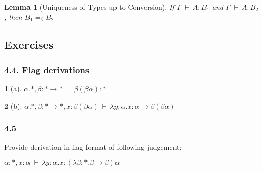 \documentclass[12pt, a4paper]{article}
\newcommand{\deriv}{\ \vdash\ }
\newtheorem{lemma}{Lemma}[section]
\newtheorem*{exercise}{}
\begin{document}
\begin{lemma}[Uniqueness of Types up to Conversion]
If $\Gamma \deriv A : B_1$ and $\Gamma \deriv A : B_2$, then $B_1 =_\beta B_2$
\end{lemma}

\subsection{Exercises}
\subsubsection{4.4. Flag derivations}
\begin{exercise}[a]
    $\alpha . *, \beta : * \to * \deriv \beta(\beta\alpha) : *$
\end{exercise}
\begin{flagderiv}
    \assume{}{\alpha : *}{}
    \assume{}{\beta : * \to *}{}
\end{flagderiv}

\begin{exercise}[b]
    $\alpha . *, \beta : * \to *, x : \beta(\beta\alpha) \deriv \lambda y : \alpha . x : \alpha \to \beta(\beta\alpha)$
\end{exercise}
\begin{flagderiv}
    \assume{}{\alpha : *}{}
    \assume{}{\beta : * \to *}{}
\end{flagderiv}


\subsubsection{4.5}
Provide derivation in flag format of following judgement:

$\alpha : *, x : \alpha \deriv \lambda y : \alpha . x : (\lambda \beta : * . \beta \to \beta)\alpha$

\begin{flagderiv}
\end{flagderiv}
\end{document}
